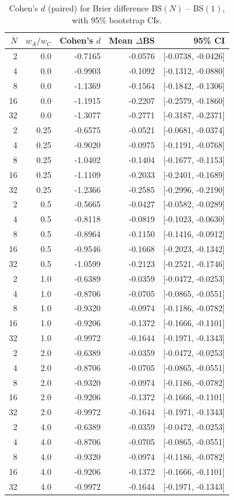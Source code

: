 \begin{table}[htbp]
\centering
\caption{Cohen's $d$ (paired) for Brier difference BS$(N)$ -- BS$(1)$, with 95\% bootstrap CIs.}
\label{tab:effect_sizes}
\small
\begin{tabular}{@{}rrrrr@{}}
\toprule
  $N$ & $w_A/w_C$ & Cohen's $d$ & Mean $\Delta$BS & 95\% CI \\
\midrule
  2 & 0.0 & -0.7165 & -0.0576 & [-0.0738, -0.0426] \\
  4 & 0.0 & -0.9903 & -0.1092 & [-0.1312, -0.0880] \\
  8 & 0.0 & -1.1369 & -0.1564 & [-0.1842, -0.1306] \\
  16 & 0.0 & -1.1915 & -0.2207 & [-0.2579, -0.1860] \\
  32 & 0.0 & -1.3077 & -0.2771 & [-0.3187, -0.2371] \\
  2 & 0.25 & -0.6575 & -0.0521 & [-0.0681, -0.0374] \\
  4 & 0.25 & -0.9020 & -0.0975 & [-0.1191, -0.0768] \\
  8 & 0.25 & -1.0402 & -0.1404 & [-0.1677, -0.1153] \\
  16 & 0.25 & -1.1109 & -0.2033 & [-0.2401, -0.1689] \\
  32 & 0.25 & -1.2366 & -0.2585 & [-0.2996, -0.2190] \\
  2 & 0.5 & -0.5665 & -0.0427 & [-0.0582, -0.0289] \\
  4 & 0.5 & -0.8118 & -0.0819 & [-0.1023, -0.0630] \\
  8 & 0.5 & -0.8964 & -0.1150 & [-0.1416, -0.0912] \\
  16 & 0.5 & -0.9546 & -0.1668 & [-0.2023, -0.1342] \\
  32 & 0.5 & -1.0599 & -0.2123 & [-0.2521, -0.1746] \\
  2 & 1.0 & -0.6389 & -0.0359 & [-0.0472, -0.0253] \\
  4 & 1.0 & -0.8706 & -0.0705 & [-0.0865, -0.0551] \\
  8 & 1.0 & -0.9320 & -0.0974 & [-0.1186, -0.0782] \\
  16 & 1.0 & -0.9206 & -0.1372 & [-0.1666, -0.1101] \\
  32 & 1.0 & -0.9972 & -0.1644 & [-0.1971, -0.1343] \\
  2 & 2.0 & -0.6389 & -0.0359 & [-0.0472, -0.0253] \\
  4 & 2.0 & -0.8706 & -0.0705 & [-0.0865, -0.0551] \\
  8 & 2.0 & -0.9320 & -0.0974 & [-0.1186, -0.0782] \\
  16 & 2.0 & -0.9206 & -0.1372 & [-0.1666, -0.1101] \\
  32 & 2.0 & -0.9972 & -0.1644 & [-0.1971, -0.1343] \\
  2 & 4.0 & -0.6389 & -0.0359 & [-0.0472, -0.0253] \\
  4 & 4.0 & -0.8706 & -0.0705 & [-0.0865, -0.0551] \\
  8 & 4.0 & -0.9320 & -0.0974 & [-0.1186, -0.0782] \\
  16 & 4.0 & -0.9206 & -0.1372 & [-0.1666, -0.1101] \\
  32 & 4.0 & -0.9972 & -0.1644 & [-0.1971, -0.1343] \\
\bottomrule
\end{tabular}
\end{table}
